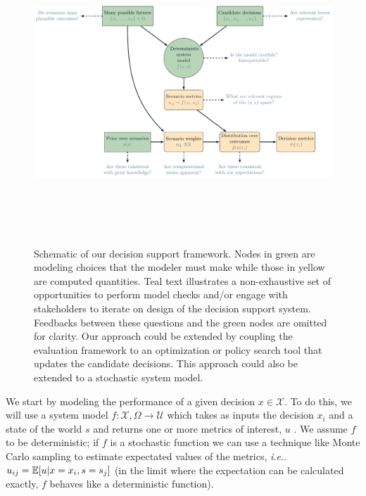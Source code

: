 \documentclass[12pt]{article}
\makeatletter
\DeclareRobustCommand\onedot{\futurelet\@let@token\@onedot}
\def\@onedot{\ifx\@let@token.\else.\null\fi\xspace}
\def\ie{\emph{i.e}\onedot} \def\Ie{\emph{I.e}\onedot}
\makeatother
\begin{document}
\begin{figure}
    \centering
    \includegraphics[width=\textwidth, height=4.5in, keepaspectratio=true]{conceptual.pdf}
    \caption{
        Schematic of our decision support framework.
        Nodes in green are modeling choices that the modeler must make while those in yellow are computed quantities.
        Teal text illustrates a non-exhaustive set of opportunities to perform model checks and/or engage with stakeholders to iterate on design of the decision support system.
        Feedbacks between these questions and the green nodes are omitted for clarity.
        Our approach could be extended by coupling the evaluation framework to an optimization or policy search tool that updates the candidate decisions.
        This approach could also be extended to a stochastic system model.
    }\label{fig:framework}
\end{figure}

We start by modeling the performance of a given decision $x \in \mathcal{X}$.
To do this, we will use a system model $f: \mathcal{X}, \Omega \rightarrow \mathcal{U}$ which takes as inputs the decision $x_i$ and a state of the world $s$ and returns one or more metrics of interest, $u$ \citep[we generally follow the notation of][]{mcphail_robustness:2019}.
We assume $f$ to be deterministic; if $f$ is a stochastic function we can use a technique like Monte Carlo sampling to estimate expectated values of the metrics, \ie $u_{ij} = \mathbb{E}\qty[u | x=x_i, s=s_j]$ (in the limit where the expectation can be calculated exactly, $f$ behaves like a deterministic function).
\end{document}
